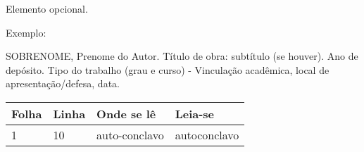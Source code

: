 
\begin{errata}
	Elemento opcional.

	Exemplo:

	\vspace{\onelineskip}

	SOBRENOME, Prenome do Autor. Título de obra: subtítulo (se houver). Ano de depósito. Tipo do trabalho (grau e curso) - Vinculação acadêmica, local de apresentação/defesa, data.

	\begin{table}[htb]
		\center
		\begin{tabular}{|p{2.4cm}|p{2cm}|p{3cm}|p{3cm}|}
			\hline
			\textbf{Folha} & \textbf{Linha} & \textbf{Onde se lê} & \textbf{Leia-se} \\
			\hline
			1              & 10             & auto-conclavo       & autoconclavo     \\
			\hline
		\end{tabular}
	\end{table}

\end{errata}
